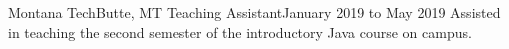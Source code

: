
        
\experienceHeading
{Montana Tech}{Butte, MT}
{Teaching Assistant}{January 2019 to May 2019}
\experienceStart
        {Assisted in teaching the second semester of the introductory Java course on campus.}
\experienceEnd
